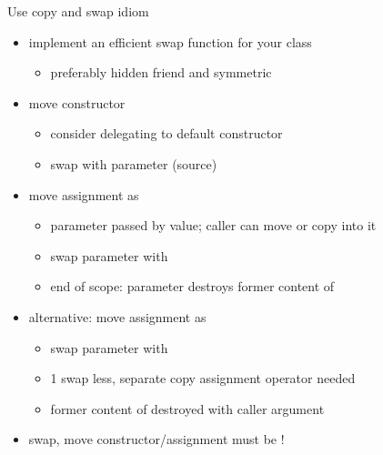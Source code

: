 \begin{frame}[fragile]
  \begin{block}{Use copy and swap idiom}
    \begin{itemize}
    \item implement an efficient swap function for your class
      \begin{itemize}
      \item preferably hidden friend and symmetric
      \end{itemize}
    \item move constructor
      \begin{itemize}
      \item consider delegating to default constructor
      \item swap  with parameter (source)
      \end{itemize}
    \item move assignment as 
      \begin{itemize}
      \item parameter passed by value; caller can move or copy into it
      \item swap parameter with 
      \item end of scope: parameter destroys former content of 
      \end{itemize}
    \item alternative: move assignment as 
      \begin{itemize}
      \item swap parameter with 
      \item 1 swap less, separate copy assignment operator needed
      \item former content of  destroyed with caller argument
      \end{itemize}
    \item swap, move constructor/assignment must be !
    \end{itemize}
  \end{block}
\end{frame}

